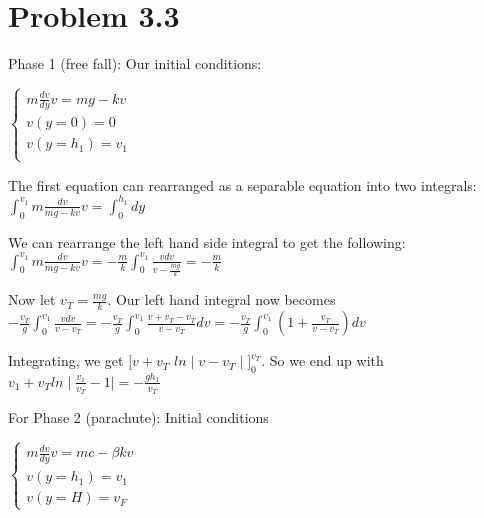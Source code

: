 \documentclass{article}
\begin{document}
\section{Problem 3.3}

Phase 1 (free fall): Our initial conditions: \par\vspace{0.25cm}

$\begin{cases}
    m \frac{dv}{dy} v = mg - kv \\
    v(y = 0) = 0 \\
    v (y = h_{1}) = v_{1} \\
    \end{cases}$
    
\par\vspace{0.25cm}

\noindent The first equation can rearranged as a separable equation into two integrals: $\int_{0}^{v_1} m \frac{dv}{mg - kv}v = \int_{0}^{h_1} dy$ \par
\noindent We can rearrange the left hand side integral to get the following: $\int_{0}^{v_1} m \frac{dv}{mg - kv}v = -\frac{m}{k} \int_{0}^{v_{1}} \frac{v dv}{v - \frac{mg}{k}} = -\frac{m}{k}$ \par
\noindent Now let $v_{T} = \frac{mg}{k}$.  Our left hand integral now becomes $-\frac{v_{T}}{g} \int_{0}^{v_{1}} \frac{vdv}{v - v_{T}} = -\frac{v_{T}}{g} \int_{0}^{v_{1}} \frac{v + v_{T} - v_{T}}{v - v_{T}} dv = -\frac{v_{T}}{g} \int_{0}^{v_{1}} (1 + \frac{v_{T}}{v - v_{T}}) dv$ \par
\noindent Integrating, we get $[v + v_{T}$ $ln\mid v - v_{T} \mid ]_{0}^{v_{T}}$.  So we end up with $v_{1} + v_{T} ln \mid \frac{v_{1}}{v_{T}} - 1 \mid = -\frac{gh_{1}}{v_{T}}$ \par\vspace{0.25cm}

\noindent For Phase 2 (parachute): Initial conditions \par\vspace{0.25cm}

$\begin{cases}
    m \frac{dv}{dy}v = mc - \beta kv \\
    v(y = h_{1}) = v_{1} \\
    v(y = H) = v_{F}
    \end{cases}$
    
\par\vspace{0.25cm}
\end{document}
